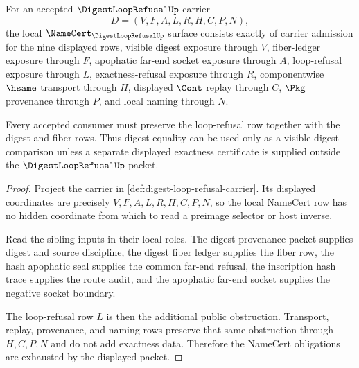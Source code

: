 \begin{theorem}
\label{thm:digest-loop-refusal-namecert-obligations}
For an accepted $\DigestLoopRefusalUp$ carrier
$$
D=(V,F,A,L,R,H,C,P,N),
$$
the local $\NameCert_{\DigestLoopRefusalUp}$ surface consists exactly of carrier admission for the nine displayed rows, visible digest exposure through $V$, fiber-ledger exposure through $F$, apophatic far-end socket exposure through $A$, loop-refusal exposure through $L$, exactness-refusal exposure through $R$, componentwise $\hsame$ transport through $H$, displayed $\Cont$ replay through $C$, $\Pkg$ provenance through $P$, and local naming through $N$.

Every accepted consumer must preserve the loop-refusal row together with the digest and fiber rows. Thus digest equality can be used only as a visible digest comparison unless a separate displayed exactness certificate is supplied outside the $\DigestLoopRefusalUp$ packet.
\end{theorem}
\begin{proof}
Project the carrier in \autoref{def:digest-loop-refusal-carrier}. Its displayed coordinates are precisely $V,F,A,L,R,H,C,P,N$, so the local NameCert row has no hidden coordinate from which to read a preimage selector or host inverse.

Read the sibling inputs in their local roles. The digest provenance packet supplies digest and source discipline, the digest fiber ledger supplies the fiber row, the hash apophatic seal supplies the common far-end refusal, the inscription hash trace supplies the route audit, and the apophatic far-end socket supplies the negative socket boundary.

The loop-refusal row $L$ is then the additional public obstruction. Transport, replay, provenance, and naming rows preserve that same obstruction through $H,C,P,N$ and do not add exactness data. Therefore the NameCert obligations are exhausted by the displayed packet.
\end{proof}

